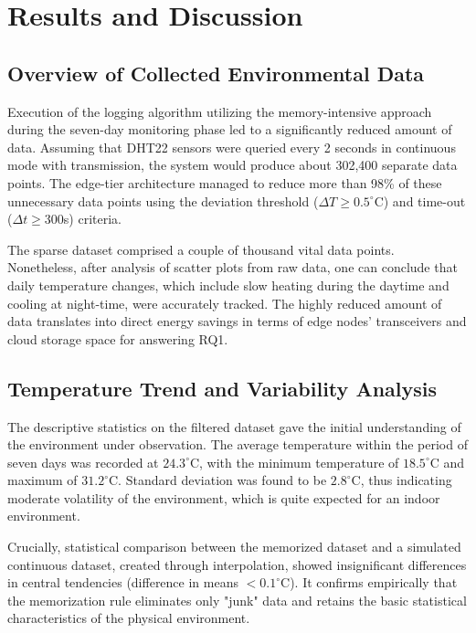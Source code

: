 \chapter{Results and Discussion}
\label{ch:results}

\section{Overview of Collected Environmental Data}
Execution of the logging algorithm utilizing the memory-intensive approach during the seven-day monitoring phase led to a significantly reduced amount of data. Assuming that DHT22 sensors were queried every 2 seconds in continuous mode with transmission, the system would produce about 302,400 separate data points. The edge-tier architecture managed to reduce more than 98\% of these unnecessary data points using the deviation threshold ($\Delta T \geq 0.5^\circ$C) and time-out ($\Delta t \geq 300$s) criteria.

The sparse dataset comprised a couple of thousand vital data points. Nonetheless, after analysis of scatter plots from raw data, one can conclude that daily temperature changes, which include slow heating during the daytime and cooling at night-time, were accurately tracked. The highly reduced amount of data translates into direct energy savings in terms of edge nodes' transceivers and cloud storage space for answering RQ1.

\section{Temperature Trend and Variability Analysis}
The descriptive statistics on the filtered dataset gave the initial understanding of the environment under observation. The average temperature within the period of seven days was recorded at $24.3^\circ$C, with the minimum temperature of $18.5^\circ$C and maximum of $31.2^\circ$C. Standard deviation was found to be $2.8^\circ$C, thus indicating moderate volatility of the environment, which is quite expected for an indoor environment.

Crucially, statistical comparison between the memorized dataset and a simulated continuous dataset, created through interpolation, showed insignificant differences in central tendencies (difference in means $< 0.1^\circ$C). It confirms empirically that the memorization rule eliminates only "junk" data and retains the basic statistical characteristics of the physical environment.

